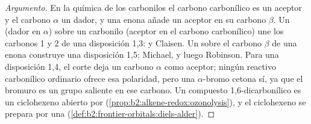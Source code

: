 \begin{proof}[Argumento]
En la química de los carbonilos el carbono carbonílico es un aceptor y el carbono $\alpha$ un dador, y una enona
añade un aceptor en su carbono $\beta$. Un  (dador en $\alpha$) sobre un carbonilo (aceptor en el
carbono carbonílico) une los carbonos 1 y 2 de una disposición 1,3:  y Claisen. Un  sobre el carbono $\beta$
de una enona construye una disposición 1,5: Michael, y luego Robinson. Para una disposición 1,4, el corte deja un
carbono $\alpha$ como aceptor; ningún reactivo carbonílico ordinario ofrece esa polaridad, pero una $\alpha$-bromo
cetona sí, ya que el bromuro es un grupo saliente en ese carbono. Un compuesto 1,6-dicarbonílico es un ciclohexeno abierto
por  (\cref{prop:b2:alkene-redox:ozonolysis}), y el ciclohexeno se prepara por una  (\cref{def:b2:frontier-orbitals:diels-alder}).
\end{proof}

